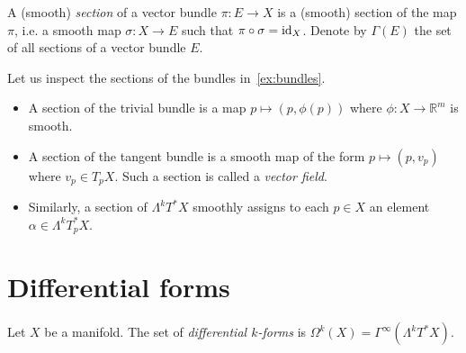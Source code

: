 \documentclass{article}
\begin{document}
\begin{definition}
  A  (smooth) \emph{section} of a vector bundle $\pi:E\to X$ is a (smooth)
  section of the map $\pi$, i.e. a smooth map $\sigma : X\to E$ such that $\pi
  \circ \sigma = \operatorname{id}_X$. Denote by $\Gamma(E)$ the set of all sections of
  a vector bundle $E$.
\end{definition}

\begin{example}
  Let us inspect the sections of the bundles in~\ref{ex:bundles}.
  \begin{itemize}
    \item A section of the trivial bundle is a map $p\mapsto (p,\phi(p))$ where $\phi:X\to\mathbb{R}^m$ is smooth.
    \item A section of the tangent bundle is a smooth map of the form
      $p\mapsto (p,v_p)$ where $v_p\in T_p X$. Such a section is called
      a \emph{vector field}.
    \item Similarly, a section of $\Lambda^k T^* X$ smoothly assigns to each
      $p\in X$ an element $\alpha\in\Lambda^k T^*_p X$.
  \end{itemize}
\end{example}

\section{Differential forms}

\begin{definition}
  Let $X$ be a manifold. The set of \emph{differential $k$-forms} is
  $\Omega^k(X) = \Gamma^\infty(\Lambda^k T^* X)$.
\end{definition}
\end{document}
